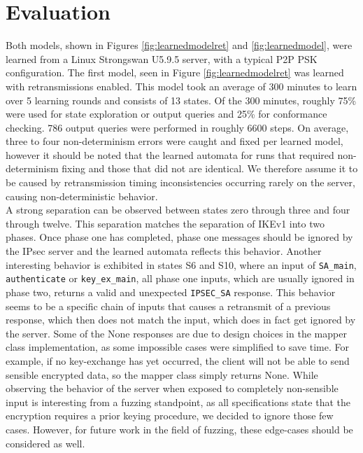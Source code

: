 \documentclass[runningheads]{llncs}
\begin{document}
\section{Evaluation} \label{chap:5} %
Both models, shown in Figures \ref{fig:learnedmodelret} and \ref{fig:learnedmodel}, were learned from a Linux Strongswan U5.9.5 server, with a typical P2P PSK configuration. The first model, seen in Figure \ref{fig:learnedmodelret} was learned with retransmissions enabled. This model took an average of 300 minutes to learn over 5 learning rounds and consists of 13 states. Of the 300 minutes, roughly 75\% were used for state exploration or output queries and 25\% for conformance checking. 786 output queries were performed in roughly 6600 steps. On average, three to four non-determinism errors were caught and fixed per learned model, however it should be noted that the learned automata for runs that required non-determinism fixing and those that did not are identical. We therefore assume it to be caused by retransmission timing inconsistencies occurring rarely on the server, causing non-deterministic behavior. \\

A strong separation can be observed between states zero through three and four through twelve. This separation matches the separation of IKEv1 into two phases. Once phase one has completed, phase one messages should be ignored by the IPsec server and the learned automata reflects this behavior. Another interesting behavior is exhibited in states S6 and S10, where an input of \texttt{SA\_main}, \texttt{authenticate} or \texttt{key\_ex\_main}, all phase one inputs, which are usually ignored in phase two, returns a valid and unexpected \texttt{IPSEC\_SA} response. This behavior seems to be a specific chain of inputs that causes a retransmit of a previous response, which then does not match the input, which does in fact get ignored by the server. Some of the None responses are due to design choices in the mapper class implementation, as some impossible cases were simplified to save time. For example, if no key-exchange has yet occurred, the client will not be able to send sensible encrypted data, so the mapper class simply returns None. While observing the behavior of the server when exposed to completely non-sensible input is interesting from a fuzzing standpoint, as all specifications state that the encryption requires a prior keying procedure, we decided to ignore those few cases. However, for future work in the field of fuzzing, these edge-cases should be considered as well.\\
\end{document}
